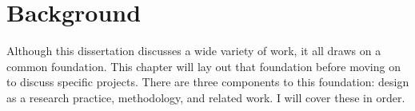 \chapter{Background}


Although this dissertation discusses a wide variety of work, it all draws on a common foundation. This chapter will lay out that foundation before moving on to discuss specific projects. There are three components to this foundation: design as a research practice, methodology, and related work. I will cover these in order.








